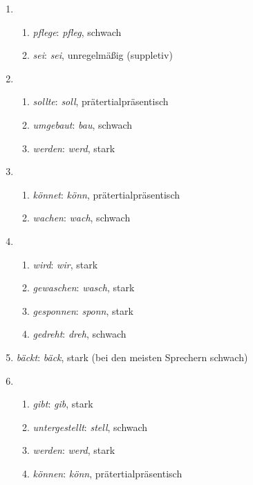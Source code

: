 \Stretch

\label{sol:verbalflexion04}

\begin{enumerate}
  \item
    \begin{enumerate}
      \item \textit{pflege}: \textit{pfleg}, schwach
      \item \textit{sei}: \textit{sei}, unregelmäßig (suppletiv)
    \end{enumerate}
  \item
    \begin{enumerate}
      \item \textit{sollte}: \textit{soll}, prätertialpräsentisch
      \item \textit{umgebaut}: \textit{bau}, schwach
      \item \textit{werden}: \textit{werd}, stark
    \end{enumerate}
  \item
    \begin{enumerate}
      \item \textit{könnet}: \textit{könn}, prätertialpräsentisch
      \item \textit{wachen}: \textit{wach}, schwach
    \end{enumerate}
  \item
    \begin{enumerate}
      \item \textit{wird}: \textit{wir}, stark
      \item \textit{gewaschen}: \textit{wasch}, stark
      \item \textit{gesponnen}: \textit{sponn}, stark
      \item \textit{gedreht}: \textit{dreh}, schwach
    \end{enumerate}
  \item \textit{bäckt}: \textit{bäck}, stark (bei den meisten Sprechern schwach)
  \item
    \begin{enumerate}
      \item \textit{gibt}: \textit{gib}, stark
      \item \textit{untergestellt}: \textit{stell}, schwach
      \item \textit{werden}: \textit{werd}, stark
      \item \textit{können}: \textit{könn}, prätertialpräsentisch
    \end{enumerate}

\end{enumerate}
